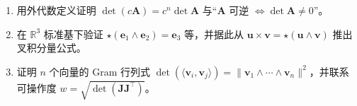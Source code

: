 \begin{practice}
\begin{enumerate}
  \item 用外代数定义证明 $\det(c\mathbf{A})=c^n\det\mathbf{A}$ 与“$\mathbf{A}$ 可逆 $\iff\det\mathbf{A}\neq0$”。
  \item 在 $\mathbb{R}^3$ 标准基下验证 $\star(\mathbf{e}_1\wedge\mathbf{e}_2)=\mathbf{e}_3$ 等，并据此从 $\mathbf{u}\times\mathbf{v}=\star(\mathbf{u}\wedge\mathbf{v})$ 推出叉积分量公式。
  \item 证明 $n$ 个向量的 Gram 行列式 $\det(\langle\mathbf{v}_i,\mathbf{v}_j\rangle)=\|\mathbf{v}_1\wedge\cdots\wedge\mathbf{v}_n\|^2$，并联系可操作度 $w=\sqrt{\det(\mathbf{J}\mathbf{J}^\top)}$。
\end{enumerate}
\end{practice}

